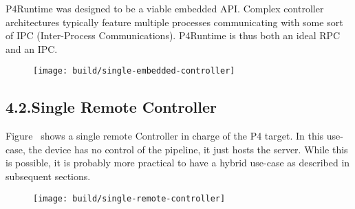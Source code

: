\documentclass[11pt]{article}
\begin{document}
{%
P4Runtime was designed to be a viable embedded API. Complex controller
architectures typically feature multiple processes communicating with some sort
of IPC (Inter-Process Communications). P4Runtime is thus both an ideal RPC and
an IPC.%

\begin{figure}[tbp]%
\begin{mdcenter}%

\noindent{}\texttt{[image: build/single-embedded-controller]}{}%

\mdhr{}%

\noindent{}%
\end{mdcenter}\label{fig-single-embedded-controller}%
\end{figure}%

\subsection{4.2.\hspace*{0.5em}Single Remote Controller}\label{sec-single-remote-controller}%

\noindent{}Figure~ shows a single remote Controller in
charge of the P4 target. In this use-case, the device has no control of the
pipeline, it just hosts the server. While this is possible, it is probably more
practical to have a hybrid use-case as described in subsequent sections.%

\begin{figure}[tbp]%
\begin{mdcenter}%

\noindent{}\texttt{[image: build/single-remote-controller]}{}%

\mdhr{}%

\noindent{}%
\end{mdcenter}\label{fig-single-remote-controller}%
\end{figure}%

}
\end{document}
